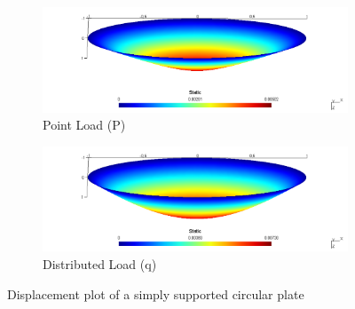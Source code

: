 \documentclass[main.tex]{subfiles}
\begin{document}
\begin{figure}[h!]
\begin{subfigure}{1\textwidth}
\includegraphics[width=\linewidth,trim={0cm 0 0cm 0},clip]{images/appedix_sim_result/C_SS_P.png}
\caption{Point Load (P)}
\end{subfigure}\vfill
\begin{subfigure}{1\textwidth}
\includegraphics[width=\linewidth,trim={0cm 0 0cm 0},clip]{images/appedix_sim_result/C_SS_q.png}
\caption{Distributed Load (q)}
\end{subfigure}
\caption{Displacement plot of a simply supported circular plate}
\end{figure}
\end{document}

